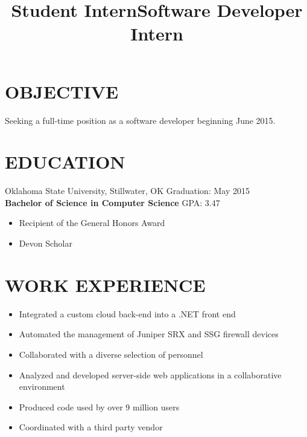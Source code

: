 \documentclass[line, overlapped]{res}
\begin{document}
\address{1875 Arbor Valley Dr \\ Edmond, OK 73025 \\ (405) 598-7827 \\ brandon@brandonsilver.com}

\begin{resume}
    \section{OBJECTIVE}
    
    Seeking a full-time position as a software developer beginning June 2015.

    \section{EDUCATION}

    Oklahoma State University, Stillwater, OK \hfill Graduation: May 2015 \\
    \textbf{Bachelor of Science in Computer Science} \hfill GPA: 3.47
    \begin{itemize}
        \item Recipient of the General Honors Award
        \item Devon Scholar
    \end{itemize}


	\section{WORK EXPERIENCE} 

    \title{Student Intern}
    \begin{position}
        \begin{itemize}
            \item Integrated a custom cloud back-end into a .NET front end
            \item Automated the management of Juniper SRX and SSG firewall devices
            \item Collaborated with a diverse selection of personnel
    \end{itemize}
    \end{position}

    \title{Software Developer Intern}
    \begin{position}
        \begin{itemize}
            \item Analyzed and developed server-side web applications in a collaborative environment
            \item Produced code used by over 9 million users
            \item Coordinated with a third party vendor
    \end{itemize}
    \end{position} 


\end{resume}
\end{document}
